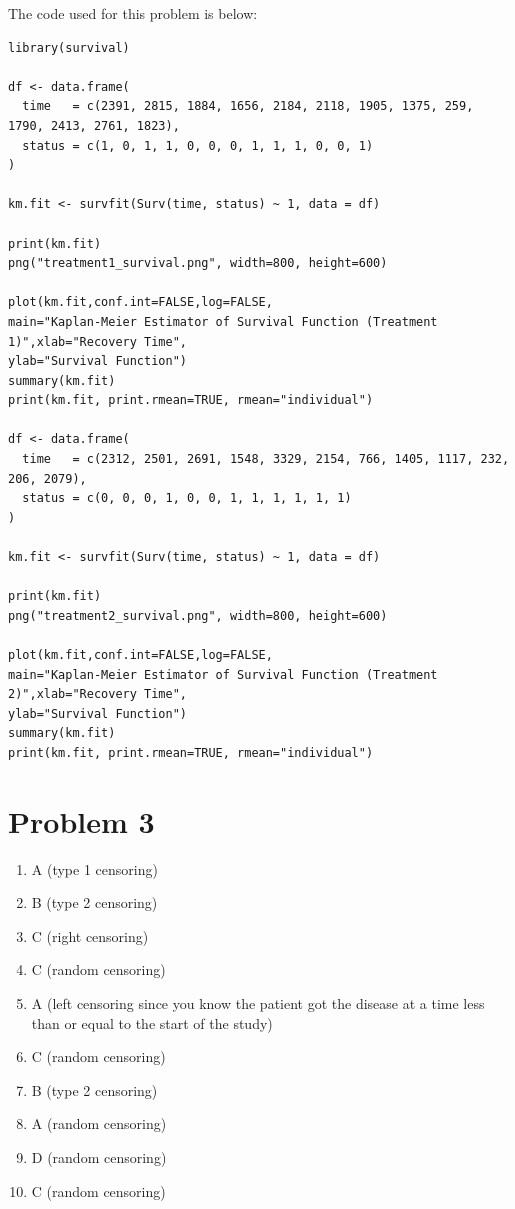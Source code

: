 \documentclass{article}
\begin{document}
The code used for this problem is below: \\
\begin{verbatim}
library(survival)

df <- data.frame(
  time   = c(2391, 2815, 1884, 1656, 2184, 2118, 1905, 1375, 259, 1790, 2413, 2761, 1823),
  status = c(1, 0, 1, 1, 0, 0, 0, 1, 1, 1, 0, 0, 1)
)

km.fit <- survfit(Surv(time, status) ~ 1, data = df)

print(km.fit)
png("treatment1_survival.png", width=800, height=600)

plot(km.fit,conf.int=FALSE,log=FALSE,
main="Kaplan-Meier Estimator of Survival Function (Treatment 1)",xlab="Recovery Time",
ylab="Survival Function")
summary(km.fit)
print(km.fit, print.rmean=TRUE, rmean="individual")

df <- data.frame(
  time   = c(2312, 2501, 2691, 1548, 3329, 2154, 766, 1405, 1117, 232, 206, 2079),
  status = c(0, 0, 0, 1, 0, 0, 1, 1, 1, 1, 1, 1)
)

km.fit <- survfit(Surv(time, status) ~ 1, data = df)

print(km.fit)
png("treatment2_survival.png", width=800, height=600)

plot(km.fit,conf.int=FALSE,log=FALSE,
main="Kaplan-Meier Estimator of Survival Function (Treatment 2)",xlab="Recovery Time",
ylab="Survival Function")
summary(km.fit)
print(km.fit, print.rmean=TRUE, rmean="individual")
\end{verbatim}
\section*{Problem 3}
\begin{enumerate}
\item A (type 1 censoring)\\
\item B (type 2 censoring)\\
\item C (right censoring) \\
\item C (random censoring) \\
\item A (left censoring since you know the patient got the disease at a time less than or equal to the start of the study) \\
\item C (random censoring) \\
\item B (type 2 censoring) \\
\item A (random censoring) \\
\item D (random censoring) \\
\item C (random censoring) 
\end{enumerate}
\end{document}
